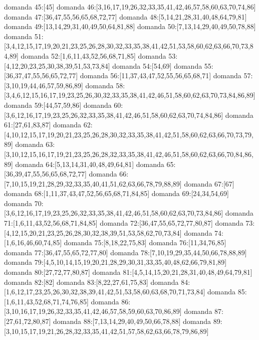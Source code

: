 domanda 45:[45]
domanda 46:[3,16,17,19,26,32,33,35,41,42,46,57,58,60,63,70,74,86]
domanda 47:[36,47,55,56,65,68,72,77]
domanda 48:[5,14,21,28,31,40,48,64,79,81]
domanda 49:[13,14,29,31,40,49,50,64,81,88]
domanda 50:[7,13,14,29,40,49,50,78,88]
domanda 51:[3,4,12,15,17,19,20,21,23,25,26,28,30,32,33,35,38,41,42,51,53,58,60,62,63,66,70,73,84,89]
domanda 52:[1,6,11,43,52,56,68,71,85]
domanda 53:[4,12,20,23,25,30,38,39,51,53,73,84]
domanda 54:[54,69]
domanda 55:[36,37,47,55,56,65,72,77]
domanda 56:[11,37,43,47,52,55,56,65,68,71]
domanda 57:[3,10,19,44,46,57,59,86,89]
domanda 58:[3,4,6,12,15,16,17,19,23,25,26,30,32,33,35,38,41,42,46,51,58,60,62,63,70,73,84,86,89]
domanda 59:[44,57,59,86]
domanda 60:[3,6,12,16,17,19,23,25,26,32,33,35,38,41,42,46,51,58,60,62,63,70,74,84,86]
domanda 61:[27,61,83,87]
domanda 62:[4,10,12,15,17,19,20,21,23,25,26,28,30,32,33,35,38,41,42,51,58,60,62,63,66,70,73,79,89]
domanda 63:[3,10,12,15,16,17,19,21,23,25,26,28,32,33,35,38,41,42,46,51,58,60,62,63,66,70,84,86,89]
domanda 64:[5,13,14,31,40,48,49,64,81]
domanda 65:[36,39,47,55,56,65,68,72,77]
domanda 66:[7,10,15,19,21,28,29,32,33,35,40,41,51,62,63,66,78,79,88,89]
domanda 67:[67]
domanda 68:[1,11,37,43,47,52,56,65,68,71,84,85]
domanda 69:[24,34,54,69]
domanda 70:[3,6,12,16,17,19,23,25,26,32,33,35,38,41,42,46,51,58,60,62,63,70,73,84,86]
domanda 71:[1,6,11,43,52,56,68,71,84,85]
domanda 72:[36,47,55,65,72,77,80,87]
domanda 73:[4,12,15,20,21,23,25,26,28,30,32,38,39,51,53,58,62,70,73,84]
domanda 74:[1,6,16,46,60,74,85]
domanda 75:[8,18,22,75,83]
domanda 76:[11,34,76,85]
domanda 77:[36,47,55,65,72,77,80]
domanda 78:[7,10,19,29,35,44,50,66,78,88,89]
domanda 79:[4,5,10,14,15,19,20,21,28,29,30,31,33,35,40,48,62,66,79,81,89]
domanda 80:[27,72,77,80,87]
domanda 81:[4,5,14,15,20,21,28,31,40,48,49,64,79,81]
domanda 82:[82]
domanda 83:[8,22,27,61,75,83]
domanda 84:[1,6,12,17,23,25,26,30,32,38,39,41,42,51,53,58,60,63,68,70,71,73,84]
domanda 85:[1,6,11,43,52,68,71,74,76,85]
domanda 86:[3,10,16,17,19,26,32,33,35,41,42,46,57,58,59,60,63,70,86,89]
domanda 87:[27,61,72,80,87]
domanda 88:[7,13,14,29,40,49,50,66,78,88]
domanda 89:[3,10,15,17,19,21,26,28,32,33,35,41,42,51,57,58,62,63,66,78,79,86,89]

